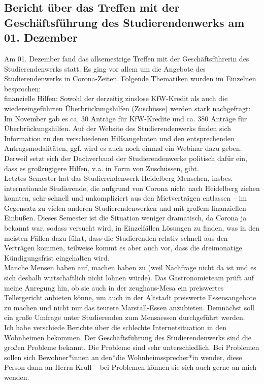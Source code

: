 \subsection{Bericht über das Treffen mit der Geschäftsführung des Studierendenwerks am 01. Dezember}
Am 01. Dezember fand das allsemestrige Treffen mit der Geschäftsführerin des Studierendenwerks statt. Es ging vor allem um die Angebote des Studierendenwerks in Corona-Zeiten. Folgende Thematiken wurden im Einzelnen besprochen:\\
finanzielle Hilfen: Sowohl der derzeitig zinslose KfW-Kredit als auch die wiedereingeführten Überbrückungshilfen (Zuschüsse) werden stark nachgefragt: Im November gab es ca. 30 Anträge für KfW-Kredite und ca. 380 Anträge für Überbrückungshilfen. Auf der Website des Studierendenwerks finden sich Information zu den verschiedenen Hilfsangeboten und den entsprechenden Antragsmodalitäten, ggf. wird es auch noch einmal ein Webinar dazu geben. Derweil setzt sich der Dachverband der Studierendenwerke politisch dafür ein, dass es großzügigere Hilfen, v.a. in Form von Zuschüssen, gibt.\\
Letztes Semester hat das Studierendenwerk Heidelberg Menschen, insbes. internationale Studierende, die aufgrund von Corona nicht nach Heidelberg ziehen konnten, sehr schnell und unkompliziert aus den Mietverträgen entlassen – im Gegensatz zu vielen anderen Studierendenwerken und mit großem finanziellen Einbußen. Dieses Semester ist die Situation weniger dramatisch, da Corona ja bekannt war, sodass versucht wird, in Einzelfällen Lösungen zu finden, was in den meisten Fällen dazu führt, dass die Studierenden relativ schnell aus den Verträgen kommen, teilweise kommt es aber auch vor, dass die dreimonatige Kündigungsfrist eingehalten wird.\\
Manche Mensen haben auf, machen haben zu (weil Nachfrage nicht da ist und es sich deshalb wirtschaftlich nicht lohnen würde). Das Gastronomieteam prüft auf meine Anregung hin, ob sie auch in der zeughaus-Mesa ein preiswertes Tellergericht anbieten könne, um auch in der Altstadt preiswerte Essensangebote zu machen und nicht nur das teurere Marstall-Essen anzubieten. Demnächst soll ein große Umfrage unter Studierenden zum Mensaessen durchgeführt werden.\\
Ich habe verschiede Berichte über die schlechte Internetsituation in den Wohnheimen bekommen. Der Geschäftsführung des Studierendenwerks sind die großen Probleme bekannt. Die Probleme sind sehr unterschiedlich. Bei Problemen sollen sich Bewohner*innen an den*die Wohnheimssprecher*in wender, diese Person dann an Herrn Krull – bei Problemen können sie sich auch gerne an mich wenden.\\
